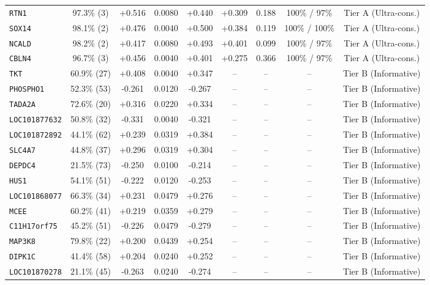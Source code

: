 \documentclass[9pt,a4paper]{article}
\begin{document}
{\begin{tabular}{lcccccccc}
\texttt{RTN1} & 97.3\% (3) & +0.516 & 0.0080 & +0.440 & +0.309 & 0.188 & 100\% / 97\% & Tier A (Ultra-cons.) \\
\texttt{SOX14} & 98.1\% (2) & +0.476 & 0.0040 & +0.500 & +0.384 & 0.119 & 100\% / 100\% & Tier A (Ultra-cons.) \\
\texttt{NCALD} & 98.2\% (2) & +0.417 & 0.0080 & +0.493 & +0.401 & 0.099 & 100\% / 97\% & Tier A (Ultra-cons.) \\
\texttt{CBLN4} & 96.7\% (3) & +0.456 & 0.0040 & +0.401 & +0.275 & 0.366 & 100\% / 97\% & Tier A (Ultra-cons.) \\
\midrule
\texttt{TKT} & 60.9\% (27) & +0.408 & 0.0040 & +0.347 & -- & -- & -- & Tier B (Informative) \\
\texttt{PHOSPHO1} & 52.3\% (53) & -0.261 & 0.0120 & -0.267 & -- & -- & -- & Tier B (Informative) \\
\texttt{TADA2A} & 72.6\% (20) & +0.316 & 0.0220 & +0.334 & -- & -- & -- & Tier B (Informative) \\
\texttt{LOC101877632} & 50.8\% (32) & -0.331 & 0.0040 & -0.321 & -- & -- & -- & Tier B (Informative) \\
\texttt{LOC101872892} & 44.1\% (62) & +0.239 & 0.0319 & +0.384 & -- & -- & -- & Tier B (Informative) \\
\texttt{SLC4A7} & 44.8\% (37) & +0.296 & 0.0319 & +0.304 & -- & -- & -- & Tier B (Informative) \\
\texttt{DEPDC4} & 21.5\% (73) & -0.250 & 0.0100 & -0.214 & -- & -- & -- & Tier B (Informative) \\
\texttt{HUS1} & 54.1\% (51) & -0.222 & 0.0120 & -0.253 & -- & -- & -- & Tier B (Informative) \\
\texttt{LOC101868077} & 66.3\% (34) & +0.231 & 0.0479 & +0.276 & -- & -- & -- & Tier B (Informative) \\
\texttt{MCEE} & 60.2\% (41) & +0.219 & 0.0359 & +0.279 & -- & -- & -- & Tier B (Informative) \\
\texttt{C11H17orf75} & 45.2\% (51) & -0.226 & 0.0479 & -0.279 & -- & -- & -- & Tier B (Informative) \\
\texttt{MAP3K8} & 79.8\% (22) & +0.200 & 0.0439 & +0.254 & -- & -- & -- & Tier B (Informative) \\
\texttt{DIPK1C} & 41.4\% (58) & +0.204 & 0.0240 & +0.252 & -- & -- & -- & Tier B (Informative) \\
\texttt{LOC101870278} & 21.1\% (45) & -0.263 & 0.0240 & -0.274 & -- & -- & -- & Tier B (Informative) \\
\bottomrule\end{tabular}}\clearpage
\end{document}
